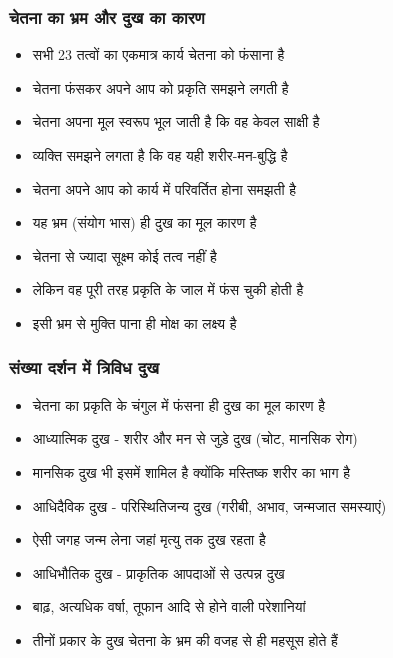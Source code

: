 \begin{frame}[fragile]\frametitle{चेतना का भ्रम और दुख का कारण}
      \begin{itemize}
          \item सभी 23 तत्वों का एकमात्र कार्य चेतना को फंसाना है
          \item चेतना फंसकर अपने आप को प्रकृति समझने लगती है
          \item चेतना अपना मूल स्वरूप भूल जाती है कि वह केवल साक्षी है
          \item व्यक्ति समझने लगता है कि वह यही शरीर-मन-बुद्धि है
          \item चेतना अपने आप को कार्य में परिवर्तित होना समझती है
          \item यह भ्रम (संयोग भास) ही दुख का मूल कारण है
          \item चेतना से ज्यादा सूक्ष्म कोई तत्व नहीं है
          \item लेकिन वह पूरी तरह प्रकृति के जाल में फंस चुकी होती है
          \item इसी भ्रम से मुक्ति पाना ही मोक्ष का लक्ष्य है
      \end{itemize}
\end{frame}

\begin{frame}[fragile]\frametitle{संख्या दर्शन में त्रिविध दुख}
      \begin{itemize}
          \item चेतना का प्रकृति के चंगुल में फंसना ही दुख का मूल कारण है
          \item आध्यात्मिक दुख - शरीर और मन से जुड़े दुख (चोट, मानसिक रोग)
          \item मानसिक दुख भी इसमें शामिल है क्योंकि मस्तिष्क शरीर का भाग है
          \item आधिदैविक दुख - परिस्थितिजन्य दुख (गरीबी, अभाव, जन्मजात समस्याएं)
          \item ऐसी जगह जन्म लेना जहां मृत्यु तक दुख रहता है
          \item आधिभौतिक दुख - प्राकृतिक आपदाओं से उत्पन्न दुख
          \item बाढ़, अत्यधिक वर्षा, तूफान आदि से होने वाली परेशानियां
          \item तीनों प्रकार के दुख चेतना के भ्रम की वजह से ही महसूस होते हैं
      \end{itemize}
\end{frame}

